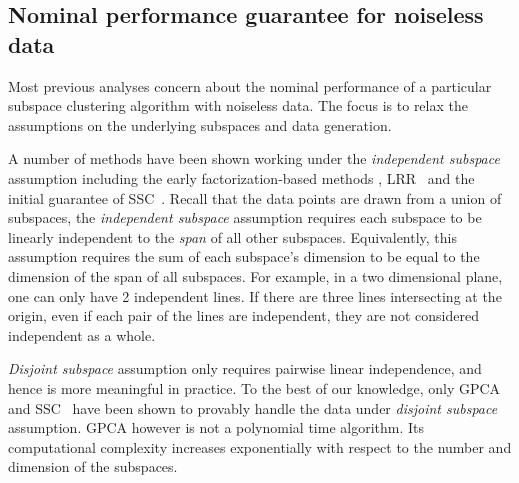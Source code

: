 \documentclass[main]{subfiles}
\begin{document}
\subsection{Nominal performance guarantee for noiseless data}
Most previous analyses concern about the nominal performance of a particular subspace clustering algorithm with noiseless data. The focus is to relax the assumptions on the underlying subspaces and data generation.

A number of methods have been shown working under the \emph{independent subspace} assumption including the early factorization-based methods \cite{costeira1998motion_seg,kanatani2001motion}, LRR~\cite{liu2010lrr_icml} and the initial guarantee of SSC~\cite{elhamifar2009ssc}. Recall that the data points are drawn from a union of subspaces, the \emph{independent subspace } assumption requires each subspace to be linearly independent to the {\em span} of all other subspaces. Equivalently, this assumption requires the sum of each subspace's dimension to be equal to the dimension of the span of all subspaces. For example, in a two dimensional plane, one can only have 2 independent lines. If there are three lines intersecting at the origin, even if each pair of the lines are independent, they are not considered independent as a whole.

\emph{Disjoint subspace} assumption only requires pairwise linear independence, and hence is more meaningful in practice. To the best of our knowledge, only GPCA~\cite{vidal2005gpca} and SSC~\cite{elhamifar2010ssc_icassp,elhamifar2012ssc_journal} have been shown to provably handle the data under \emph{disjoint subspace} assumption. GPCA however is not a polynomial time algorithm. Its computational complexity increases exponentially with respect to the number and dimension of the subspaces.
\end{document}
